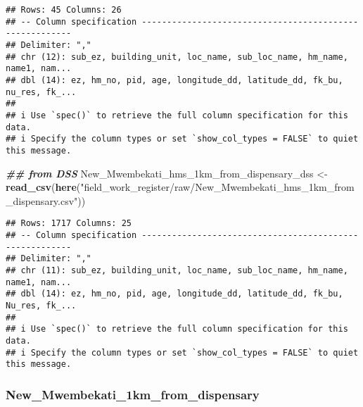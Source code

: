 \documentclass[
]{article}
\newenvironment{Shaded}{\begin{snugshade}}{\end{snugshade}}
\newcommand{\DocumentationTok}[1]{\textcolor[rgb]{0.56,0.35,0.01}{\textbf{\textit{#1}}}}
\newcommand{\FunctionTok}[1]{\textcolor[rgb]{0.13,0.29,0.53}{\textbf{#1}}}
\newcommand{\NormalTok}[1]{#1}
\newcommand{\OtherTok}[1]{\textcolor[rgb]{0.56,0.35,0.01}{#1}}
\newcommand{\StringTok}[1]{\textcolor[rgb]{0.31,0.60,0.02}{#1}}
\begin{document}
\begin{verbatim}
## Rows: 45 Columns: 26
## -- Column specification --------------------------------------------------------
## Delimiter: ","
## chr (12): sub_ez, building_unit, loc_name, sub_loc_name, hm_name, name1, nam...
## dbl (14): ez, hm_no, pid, age, longitude_dd, latitude_dd, fk_bu, nu_res, fk_...
## 
## i Use `spec()` to retrieve the full column specification for this data.
## i Specify the column types or set `show_col_types = FALSE` to quiet this message.
\end{verbatim}

\begin{Shaded}
\begin{Highlighting}[]
\DocumentationTok{\#\# from DSS}
\NormalTok{New\_Mwembekati\_hms\_1km\_from\_dispensary\_dss }\OtherTok{\textless{}{-}} \FunctionTok{read\_csv}\NormalTok{(}\FunctionTok{here}\NormalTok{(}\StringTok{"field\_work\_register/raw/New\_Mwembekati\_hms\_1km\_from\_dispensary.csv"}\NormalTok{))}
\end{Highlighting}
\end{Shaded}

\begin{verbatim}
## Rows: 1717 Columns: 25
## -- Column specification --------------------------------------------------------
## Delimiter: ","
## chr (11): sub_ez, building_unit, loc_name, sub_loc_name, hm_name, name1, nam...
## dbl (14): ez, hm_no, pid, age, longitude_dd, latitude_dd, fk_bu, Nu_res, fk_...
## 
## i Use `spec()` to retrieve the full column specification for this data.
## i Specify the column types or set `show_col_types = FALSE` to quiet this message.
\end{verbatim}

\subsubsection{New\_Mwembekati\_1km\_from\_dispensary}\label{new_mwembekati_1km_from_dispensary}
\end{document}
